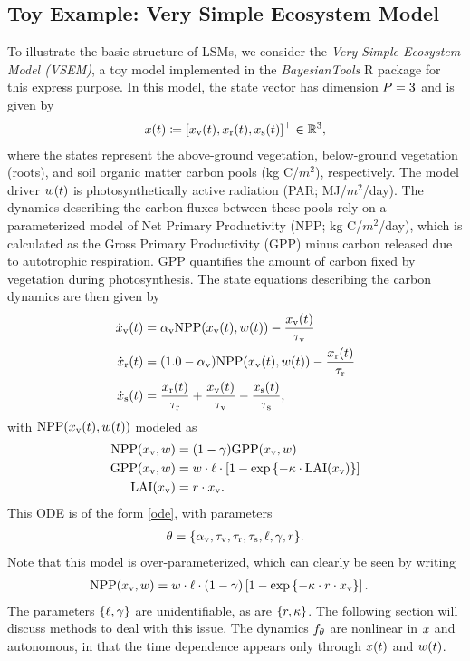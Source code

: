 \documentclass[12pt]{article}
\begin{document}
\subsection{Toy Example: Very Simple Ecosystem Model} \label{vsem}
To illustrate the basic structure of LSMs, we consider the \textit{Very Simple Ecosystem Model (VSEM)}, a toy model implemented 
in the \textit{BayesianTools} R package for this express purpose. In this model, the state vector has dimension $P=3$ and is given by 
\begin{align*}
x(t) \coloneqq [x_{\textrm{v}}(t), x_{\textrm{r}}(t), x_{\textrm{s}}(t)]^\top \in \mathbb{R}^{3}, 
\end{align*}
where the states represent the above-ground vegetation, below-ground vegetation (roots), and soil organic matter 
carbon pools (\textrm{kg C/$m^2$}), respectively. The model driver $w(t)$ is photosynthetically active radiation 
(PAR; \textrm{MJ/$m^2$/day}). The dynamics describing the carbon fluxes between these pools rely on a parameterized model 
of Net Primary Productivity (NPP; \textrm{kg C/$m^2$/day}), 
which is calculated as the Gross Primary Productivity (GPP) minus carbon released due to autotrophic respiration.
GPP quantifies the amount of carbon fixed by vegetation during photosynthesis.
The state equations describing the carbon dynamics are then given by
\begin{align}
\dot{x}_{\textrm{v}}(t) &= \alpha_{\textrm{v}} \textrm{NPP}(x_{\textrm{v}}(t), w(t)) - \frac{x_{\textrm{v}}(t)}{\tau_{\textrm{v}}} \\
\dot{x}_{\textrm{r}}(t) &= (1.0 - \alpha_{\textrm{v}}) \textrm{NPP}(x_{\textrm{v}}(t), w(t)) - \frac{x_{\textrm{r}}(t)}{\tau_{\textrm{r}}} \nonumber \\ 
\dot{x}_{\textrm{s}}(t) &= \frac{x_{\textrm{r}}(t)}{\tau_{\textrm{r}}} + \frac{x_{\textrm{v}}(t)}{\tau_{\textrm{v}}} - \frac{x_{\textrm{s}}(t)}{\tau_{\textrm{s}}}, \nonumber
\end{align}
with $\textrm{NPP}(x_{\textrm{v}}(t), w(t))$ modeled as
\begin{align}
\textrm{NPP}(x_{\textrm{v}}, w) &= (1 - \gamma) \textrm{GPP}(x_{\textrm{v}}, w) \\
\textrm{GPP}(x_{\textrm{v}}, w) &= w \cdot \ell \cdot \left[1 - \exp\left\{-\kappa \cdot \textrm{LAI}(x_{\textrm{v}}) \right\} \right] \nonumber \\
\textrm{LAI}(x_{\textrm{v}}) &= r \cdot x_{\textrm{v}}. \nonumber
\end{align} 
This ODE is of the form \ref{ode}, with parameters
\begin{align}
\theta = \{\alpha_{\textrm{v}}, \tau_{\textrm{v}}, \tau_{\textrm{r}}, \tau_{\textrm{s}}, \ell, \gamma, r\}. \label{vsem_param}
\end{align}
Note that this model is over-parameterized, which can clearly be seen by writing 
\begin{align}
\textrm{NPP}(x_{\textrm{v}}, w) &= w \cdot \ell \cdot (1 - \gamma) \left[1 - \exp\left\{-\kappa \cdot r \cdot x_{\textrm{v}}\right\} \right]. 
\end{align}
The parameters $\{\ell, \gamma\}$ are unidentifiable, as are $\{r, \kappa\}$. The following section will discuss methods 
to deal with this issue. 
The dynamics $f_{\theta}$ are nonlinear in $x$ and autonomous, in that the 
time dependence appears only through $x(t)$ and $w(t)$. 
\end{document}
